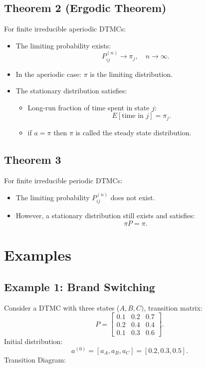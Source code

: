 \documentclass[12pt]{article}
\begin{document}
\subsection*{Theorem 2 (Ergodic Theorem)}
For finite irreducible aperiodic DTMCs:
\begin{itemize}
    \item The limiting probability exists:
    \[
    P_{ij}^{(n)} \to \pi_j, \quad n \to \infty.
    \]
    \item In the aperiodic case: $\pi$ is the limiting distribution.
    \item The stationary distribution satisfies:
    \begin{itemize}
        \item Long-run fraction of time spent in state \(j:\)
        \[
        E[\text{time in } j] = \pi_j.
        \]
        \item if $a = \pi$ then $\pi$ is called the steady state distribution.
    \end{itemize}
    
\end{itemize}

\subsection*{Theorem 3}
For finite irreducible periodic DTMCs:
\begin{itemize}
    \item The limiting probability \(P_{ij}^{(n)}\) does not exist.
    \item However, a stationary distribution still exists and satisfies:
    \[
    \pi P = \pi.
    \]
\end{itemize}


\section*{Examples}

\subsection*{Example 1: Brand Switching}
Consider a DTMC with three states (\(A, B, C)\), transition matrix:
\[ 
P =
    \begin{bmatrix}
        0.1 & 0.2 & 0.7 \\ 
        0.2 & 0.4 & 0.4 \\ 
        0.1 & 0.3 & 0.6
    \end{bmatrix}.
\]
Initial distribution: 
\[a^{(0)} = [a_A, a_B, a_C] = [0.2, 0.3, 0.5].\]
Transition Diagram:
\end{document}

